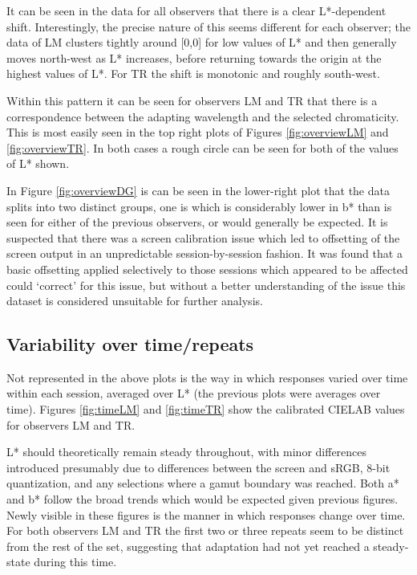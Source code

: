 It can be seen in the data for all observers that there is a clear L*-dependent shift. Interestingly, the precise nature of this seems different for each observer; the data of LM clusters tightly around [0,0] for low values of L* and then generally moves north-west as L* increases, before returning towards the origin at the highest values of L*. For TR the shift is monotonic and roughly south-west.

Within this pattern it can be seen for observers LM and TR that there is a correspondence between the adapting wavelength and the selected chromaticity. This is most easily seen in the top right plots of Figures \ref{fig:overviewLM} and \ref{fig:overviewTR}. In both cases a rough circle can be seen for both of the values of L* shown.

In Figure \ref{fig:overviewDG} is can be seen in the lower-right plot that the data splits into two distinct groups, one is which is considerably lower in b* than is seen for either of the previous observers, or would generally be expected. It is suspected that there was a screen calibration issue which led to offsetting of the screen output in an unpredictable session-by-session fashion. It was found that a basic offsetting applied selectively to those sessions which appeared to be affected could `correct' for this issue, but without a better understanding of the issue this dataset is considered unsuitable for further analysis.

\subsection{Variability over time/repeats}

Not represented in the above plots is the way in which responses varied over time within each session, averaged over L* (the previous plots were averages over time). Figures \ref{fig:timeLM} and \ref{fig:timeTR} show the calibrated CIELAB values for observers LM and TR. 

L* should theoretically remain steady throughout, with minor differences introduced presumably due to differences between the screen and sRGB, 8-bit quantization, and any selections where a gamut boundary was reached. Both a* and b* follow the broad trends which would be expected given previous figures. Newly visible in these figures is the manner in which responses change over time. For both observers LM and TR the first two or three repeats seem to be distinct from the rest of the set, suggesting that adaptation had not yet reached a steady-state during this time.

